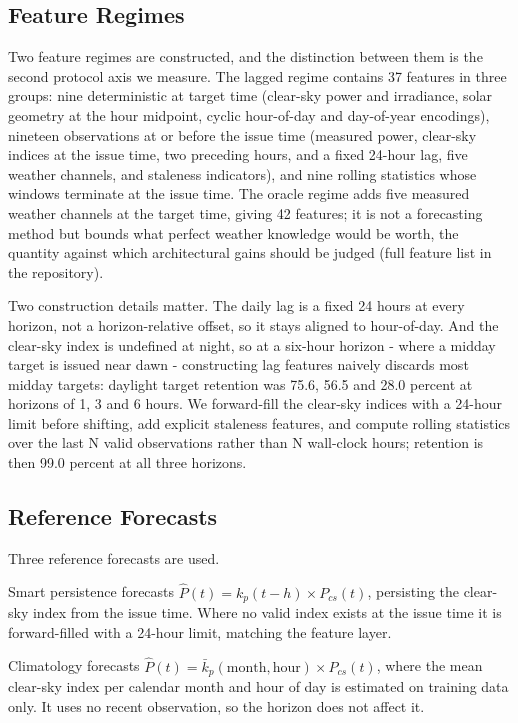 \subsection{Feature Regimes}
\label{sec:methodology-feature-regimes}

Two feature regimes are constructed, and the distinction between them
is the second protocol axis we measure. The lagged regime contains 37
features in three groups: nine deterministic at target time (clear-sky
power and irradiance, solar geometry at the hour midpoint, cyclic
hour-of-day and day-of-year encodings), nineteen observations at or
before the issue time (measured power, clear-sky indices at the issue
time, two preceding hours, and a fixed 24-hour lag, five weather
channels, and staleness indicators), and nine rolling statistics whose
windows terminate at the issue time. The oracle regime adds five
measured weather channels at the target time, giving 42 features; it
is not a forecasting method but bounds what perfect weather knowledge
would be worth, the quantity against which architectural gains should
be judged (full feature list in the repository).

Two construction details matter. The daily lag is a fixed 24 hours at
every horizon, not a horizon-relative offset, so it stays aligned to
hour-of-day. And the clear-sky index is undefined at night, so at a
six-hour horizon - where a midday target is issued near dawn -
constructing lag features naively discards most midday targets:
daylight target retention was 75.6, 56.5 and 28.0 percent at horizons
of 1, 3 and 6 hours. We forward-fill the clear-sky indices with a
24-hour limit before shifting, add explicit staleness features, and
compute rolling statistics over the last N valid observations rather
than N wall-clock hours; retention is then 99.0 percent at all three
horizons.

\subsection{Reference Forecasts}
\label{sec:methodology-reference-forecasts}

Three reference forecasts are used.

Smart persistence forecasts
$\hat{P}(t) = k_p(t-h) \times P_{cs}(t)$, persisting the
clear-sky index from the issue time. Where no valid index exists at the
issue time it is forward-filled with a 24-hour limit, matching the
feature layer.

Climatology forecasts
$\hat{P}(t) = \bar{k}_p(\text{month}, \text{hour}) \times P_{cs}(t)$,
where the
mean clear-sky index per calendar month and hour of day is estimated on
training data only. It uses no recent observation, so the horizon does
not affect it.

